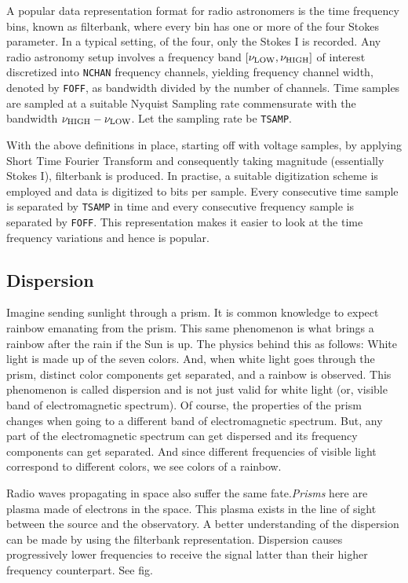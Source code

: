 \par A popular data representation format for radio astronomers is the time frequency bins, known as filterbank, where every bin has one or more of the four Stokes parameter. In a typical setting, of the four, only the Stokes I is recorded.
Any radio astronomy setup involves a frequency band $[\nu_{\rm LOW}, \nu_{\rm HIGH}]$ of interest discretized into \texttt{NCHAN} frequency channels, yielding frequency channel width, denoted by \texttt{FOFF}, as bandwidth divided by the number of channels.
Time samples are sampled at a suitable Nyquist Sampling rate commensurate with the bandwidth $\nu_{\rm HIGH} - \nu_{\rm LOW}$. Let the sampling rate be \texttt{TSAMP}.

\par With the above definitions in place, starting off with voltage samples, by applying Short Time Fourier Transform and consequently taking magnitude (essentially Stokes I), filterbank is produced. In practise, a suitable digitization scheme is employed and data is digitized to  bits per sample.
Every consecutive time sample is separated by \texttt{TSAMP} in time and every consecutive frequency sample is separated by \texttt{FOFF}.
This representation makes it easier to look at the time frequency variations and hence is popular.

\subsection{Dispersion}
\label{ssub:dis}

\par Imagine sending sunlight through a prism. It is common knowledge to expect rainbow emanating from the prism. 
This same phenomenon is what brings a rainbow after the rain if the Sun is up. The physics behind this as follows:
White light is made up of the seven colors. And, when white light goes through the prism, distinct color components get separated,
and a rainbow is observed. 
This phenomenon is called dispersion and is not just valid for white light (or, visible band of electromagnetic spectrum). 
Of course, the properties of the prism changes when going to a different band of electromagnetic spectrum. But, any part of the electromagnetic spectrum can get dispersed and its frequency components can get separated. And since different frequencies of visible light correspond to different colors, we see colors of a rainbow.

\par Radio waves propagating in space also suffer the same fate.\emph{Prisms} here are plasma made of electrons in the space. 
This plasma exists in the line of sight between the source and the observatory. A better understanding of the dispersion can be made by using the filterbank representation. Dispersion causes progressively lower frequencies to receive the signal latter than their higher frequency counterpart. See fig.

